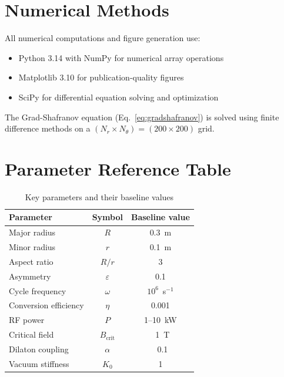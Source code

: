 \documentclass[12pt,a4paper]{article}
\begin{document}
\section{Numerical Methods}

All numerical computations and figure generation use:
\begin{itemize}
    \item Python 3.14 with NumPy for numerical array operations
    \item Matplotlib 3.10 for publication-quality figures
    \item SciPy for differential equation solving and optimization
\end{itemize}

The Grad-Shafranov equation (Eq.~\ref{eq:gradshafranov}) is solved using finite difference methods on a $(N_r \times N_\theta) = (200 \times 200)$ grid.

\section{Parameter Reference Table}

\begin{table}[H]
    \centering
    \caption{Key parameters and their baseline values}
    \label{tab:params}
    \begin{tabular}{lcc}
        \toprule
        \textbf{Parameter} & \textbf{Symbol} & \textbf{Baseline value} \\
        \midrule
        Major radius & $R$ & 0.3~m \\
        Minor radius & $r$ & 0.1~m \\
        Aspect ratio & $R/r$ & 3 \\
        Asymmetry & $\varepsilon$ & 0.1 \\
        Cycle frequency & $\omega$ & $10^6$~s$^{-1}$ \\
        Conversion efficiency & $\eta$ & 0.001 \\
        RF power & $P$ & 1--10~kW \\
        Critical field & $B_{\text{crit}}$ & ~1~T \\
        Dilaton coupling & $\alpha$ & ~0.1 \\
        Vacuum stiffness & $K_0$ & 1 \\
        \bottomrule
    \end{tabular}
\end{table}
\end{document}
